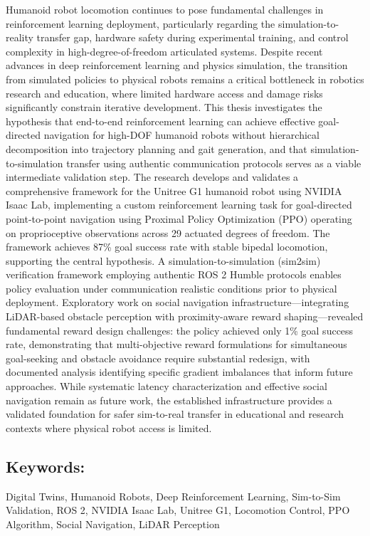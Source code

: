 \documentclass[12pt,a4paper]{article}
\begin{document}
Humanoid robot locomotion continues to pose fundamental challenges in reinforcement learning deployment, particularly regarding the simulation-to-reality transfer gap, hardware safety during experimental training, and control complexity in high-degree-of-freedom articulated systems. Despite recent advances in deep reinforcement learning and physics simulation, the transition from simulated policies to physical robots remains a critical bottleneck in robotics research and education, where limited hardware access and damage risks significantly constrain iterative development. This thesis investigates the hypothesis that end-to-end reinforcement learning can achieve effective goal-directed navigation for high-DOF humanoid robots without hierarchical decomposition into trajectory planning and gait generation, and that simulation-to-simulation transfer using authentic communication protocols serves as a viable intermediate validation step. The research develops and validates a comprehensive framework for the Unitree G1 humanoid robot using NVIDIA Isaac Lab, implementing a custom reinforcement learning task for goal-directed point-to-point navigation using Proximal Policy Optimization (PPO) operating on proprioceptive observations across 29 actuated degrees of freedom. The framework achieves 87\% goal success rate with stable bipedal locomotion, supporting the central hypothesis. A simulation-to-simulation (sim2sim) verification framework employing authentic ROS 2 Humble protocols enables policy evaluation under communication realistic conditions prior to physical deployment. Exploratory work on social navigation infrastructure---integrating LiDAR-based obstacle perception with proximity-aware reward shaping---revealed fundamental reward design challenges: the policy achieved only 1\% goal success rate, demonstrating that multi-objective reward formulations for simultaneous goal-seeking and obstacle avoidance require substantial redesign, with documented analysis identifying specific gradient imbalances that inform future approaches. While systematic latency characterization and effective social navigation remain as future work, the established infrastructure provides a validated foundation for safer sim-to-real transfer in educational and research contexts where physical robot access is limited.


\medskip



\subsection*{Keywords:}
Digital Twins, Humanoid Robots, Deep Reinforcement Learning, Sim-to-Sim Validation, ROS 2, NVIDIA Isaac Lab, Unitree G1, Locomotion Control, PPO Algorithm, Social Navigation, LiDAR Perception
\end{document}

